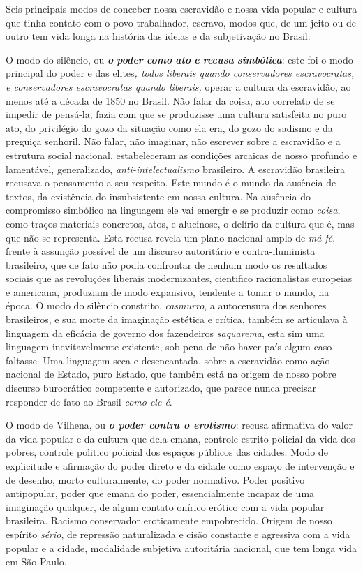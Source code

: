Seis principais modos de conceber nossa escravidão e nossa vida popular
e cultura que tinha contato com o povo trabalhador, escravo, modos que,
de um jeito ou de outro tem vida longa na história das ideias e da
subjetivação no Brasil:

O modo do silêncio, ou \emph{\textbf{o} \textbf{poder} \textbf{como}
\textbf{ato} \textbf{e} \textbf{recusa} \textbf{simbólica}}: este foi o
modo principal do poder e das elites\emph{, todos liberais quando
conservadores escravocratas, e conservadores escravocratas quando
liberais,} operar a cultura da escravidão, ao menos até a década de 1850
no Brasil. Não falar da coisa, ato correlato de se impedir de pensá-la,
fazia com que se produzisse uma cultura satisfeita no puro ato, do
privilégio do gozo da situação como ela era, do gozo do sadismo e da
preguiça senhoril. Não falar, não imaginar, não escrever sobre a
escravidão e a estrutura social nacional, estabeleceram as condições
arcaicas de nosso profundo e lamentável, generalizado,
\emph{anti-intelectualismo} brasileiro. A escravidão brasileira recusava
o pensamento a seu respeito. Este mundo é o mundo da ausência de textos,
da existência do insubsistente em nossa cultura. Na ausência do
compromisso simbólico na linguagem ele vai emergir e se produzir como
\emph{coisa}, como traços materiais concretos, atos, e alucinose, o
delírio da cultura que é, mas que não se representa. Esta recusa revela
um plano nacional amplo de \emph{má fé}, frente à assunção possível de
um discurso autoritário e contra-iluminista brasileiro, que de fato não
podia confrontar de nenhum modo os resultados sociais que as revoluções
liberais modernizantes, cientifico racionalistas europeias e americana,
produziam de modo expansivo, tendente a tomar o mundo, na época. O modo
do silêncio constrito, \emph{casmurro}, a autocensura dos senhores
brasileiros, e sua morte da imaginação estética e crítica, também se
articulava à linguagem da eficácia de governo dos fazendeiros
\emph{saquarema}, esta sim uma linguagem inevitavelmente existente, sob
pena de não haver país algum caso faltasse. Uma linguagem seca e
desencantada, sobre a escravidão como ação nacional de Estado, puro
Estado, que também está na origem de nosso pobre discurso burocrático
competente e autorizado, que parece nunca precisar responder de fato ao
Brasil \emph{como ele é}.

O modo de Vilhena, ou \emph{\textbf{o poder contra o erotismo}}: recusa
afirmativa do valor da vida popular e da cultura que dela emana,
controle estrito policial da vida dos pobres, controle politico policial
dos espaços públicos das cidades. Modo de explicitude e afirmação do
poder direto e da cidade como espaço de intervenção e de desenho, morto
culturalmente, do poder normativo. Poder positivo antipopular, poder que
emana do poder, essencialmente incapaz de uma imaginação qualquer, de
algum contato onírico erótico com a vida popular brasileira. Racismo
conservador eroticamente empobrecido. Origem de nosso espírito
\emph{sério}, de repressão naturalizada e cisão constante e agressiva
com a vida popular e a cidade, modalidade subjetiva autoritária
nacional, que tem longa vida em São Paulo.


